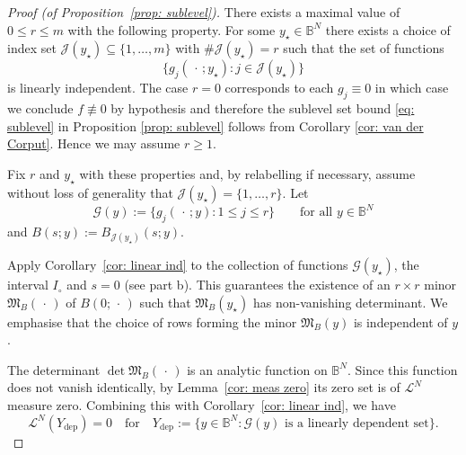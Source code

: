 \documentclass[reqno]{amsart}
\numberwithin{equation}{section}
\newcommand{\B}{\mathbb{B}}
\newcommand{\cG}{\mathcal{G}}
\newcommand{\cJ}{\mathcal{J}}
\newcommand{\cL}{\mathcal{L}}
\newcommand{\fM}{\mathfrak{M}}
\theoremstyle{plain}
\theoremstyle{definition}
\begin{document}
\begin{proof}[Proof (of Proposition~\ref{prop: sublevel})]
    There exists a maximal value of $0 \leq r \leq m$ with the following property. For some $y_{\star} \in \B^N$ there exists a choice of index set $\cJ(y_{\star}) \subseteq \{1, \dots, m\}$ with $\#\cJ(y_{\star}) = r$ such that the set of functions 
    \begin{equation*}
        \big\{ g_j(\,\cdot\,;y_{\star}) : j \in \cJ(y_{\star})\big\} 
    \end{equation*}
    is linearly independent. The case $r=0$ corresponds to each $g_j \equiv 0$ in which case we conclude $f \not\equiv 0$ by hypothesis and therefore the sublevel set bound \eqref{eq: sublevel} in Proposition \ref{prop: sublevel} follows from Corollary \ref{cor: van der Corput}. Hence we may assume $r\ge 1$.
    
    Fix $r$ and $y_{\star}$ with these properties and, by relabelling if necessary, assume without loss of generality that $\cJ(y_{\star}) = \{1, \dots, r\}$. Let 
    \begin{equation*}
       \cG(y) := \big\{ g_j(\,\cdot\,;y) : 1 \leq j \leq r \big\} \qquad \textrm{for all $y \in \B^N$}
    \end{equation*}
    and $B(s;y) := B_{\cJ(y_{\star})}(s;y)$. 

     Apply Corollary~\ref{cor: linear ind} to the collection of functions $\cG(y_{\star})$, the interval $I_{\circ}$ and $s=0$ (see part b). This guarantees the existence of an $r \times r$ minor $\fM_B(\,\cdot\,)$ of $B(0;\,\cdot\,)$ such that $\fM_B(y_{\star})$ has non-vanishing determinant. We emphasise that the choice of rows forming the minor $\fM_B(y)$ is independent of $y$.

     The determinant $\det \fM_B(\,\cdot\,)$ is an analytic function on $\B^N$. Since this function does not vanish identically, by Lemma~\ref{cor: meas zero} its zero set is of $\cL^N$ measure zero. Combining this with Corollary~\ref{cor: linear ind}, we have
    \begin{equation}\label{eq: sublevel 1}
       \cL^N(Y_{\mathrm{dep}}) = 0 \quad \textrm{for} \quad Y_{\mathrm{dep}} := \big\{ y \in \B^N : \cG(y) \textrm{ is a linearly dependent set}\big\}.
    \end{equation}
      

\end{proof}
\end{document}
